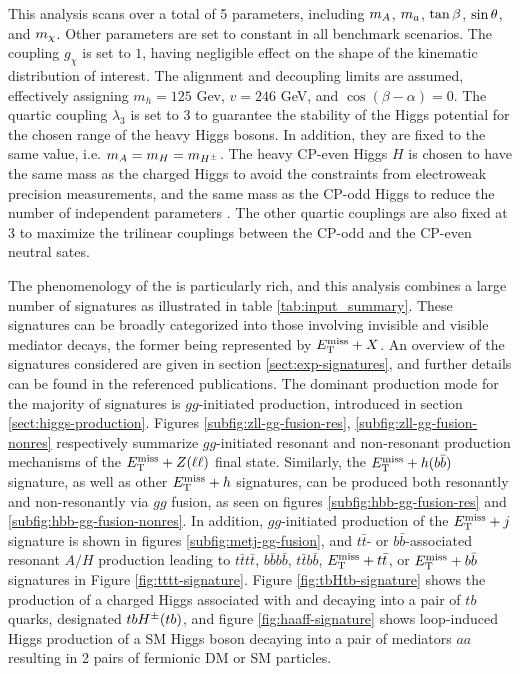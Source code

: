 This analysis scans over a total of 5 parameters, including $m_A$, $m_a$, $\tan\beta$, $\sin\theta$, and $m_{\chi}$. 
Other parameters are set to constant in all benchmark scenarios. 
The coupling $g_{\chi}$ is set to $1$, having negligible effect on the shape of the kinematic distribution of interest. 
The alignment and decoupling limits are assumed, effectively assigning $m_h=125$ Gev, $v=246$ GeV, and $\cos(\beta-\alpha)=0$. 
The quartic coupling $\lambda_3$ is set to 3 to guarantee the stability of the Higgs potential for the chosen range of the heavy Higgs bosons. 
In addition, they are fixed to the same value, i.e. $m_A= m_H=m_{H^{\pm}}$. 
The heavy CP-even Higgs $H$ is chosen to have the same mass as the charged Higgs to avoid the constraints from electroweak precision measurements, 
and the same mass as the CP-odd Higgs to reduce the number of independent parameters \cite{Bauer:2017ota}. 
The other quartic couplings are also fixed at 3 to maximize the trilinear couplings between the CP-odd and the CP-even neutral sates. 

The phenomenology of the \thdma is particularly rich, and this analysis combines a large number of signatures as illustrated in table \ref{tab:input_summary}.
These signatures can be broadly categorized into those involving invisible and visible mediator decays, the former being represented by $E_{\mathrm{T}}^{\mathrm{miss}}+X$. 
An overview of the signatures considered are given in section \ref{sect:exp-signatures}, 
and further details can be found in the referenced publications. 
The dominant production mode for the majority of signatures is $gg$-initiated production, introduced in section \ref{sect:higgs-production}. 
Figures \ref{subfig:zll-gg-fusion-res}, \ref{subfig:zll-gg-fusion-nonres} respectively summarize $gg$-initiated resonant and non-resonant production mechanisms of the $E_{\mathrm{T}}^{\mathrm{miss}}+Z(\ell\ell)$ final state. 
Similarly, the $E_{\mathrm{T}}^{\mathrm{miss}}+h(b\bar{b})$ signature, as well as other $E_{\mathrm{T}}^{\mathrm{miss}}+h$ signatures, can be produced both resonantly and non-resonantly via $gg$ fusion, as seen on figures \ref{subfig:hbb-gg-fusion-res} and \ref{subfig:hbb-gg-fusion-nonres}. 
In addition, $gg$-initiated production of the $E_{\mathrm{T}}^{\mathrm{miss}}+j$ signature is shown in figures \ref{subfig:metj-gg-fusion}, and $t\bar{t}$- or $b\bar{b}$-associated resonant $A/H$ production leading to $t\bar{t}t\bar{t}$, $b\bar{b}b\bar{b}$, $t\bar{t}b\bar{b}$, $E_{\mathrm{T}}^{\mathrm{miss}}+t\bar{t}$, or $E_{\mathrm{T}}^{\mathrm{miss}}+b\bar{b}$ signatures in Figure \ref{fig:tttt-signature}. 
Figure \ref{fig:tbHtb-signature} shows the production of a charged Higgs associated with and decaying into a pair of $tb$ quarks, designated $tbH^{\pm}(tb)$, and figure \ref{fig:haaff-signature} shows loop-induced Higgs production of a SM Higgs boson decaying into a pair of mediators $aa$ resulting in 2 pairs of fermionic DM or SM particles. 

